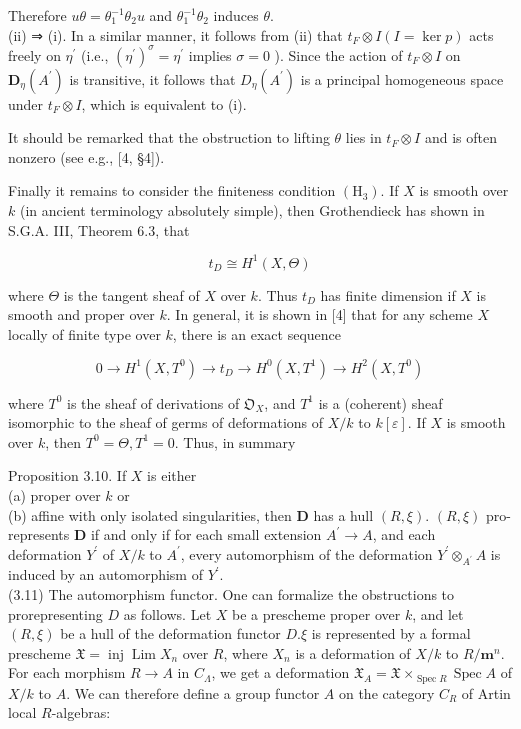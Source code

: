 \documentclass[10pt]{article}
\begin{document}
Therefore $u \theta=\theta_{1}^{-1} \theta_{2} u$ and $\theta_{1}^{-1} \theta_{2}$ induces $\theta$.\\
(ii) ⇒ (i). In a similar manner, it follows from (ii) that $t_{F} \otimes I(I=\operatorname{ker} p)$ acts freely on $\eta^{\prime}$ (i.e., $\left(\eta^{\prime}\right)^{\sigma}=\eta^{\prime}$ implies $\sigma=0$ ). Since the action of $t_{F} \otimes I$ on $\boldsymbol{D}_{\eta}\left(A^{\prime}\right)$ is transitive, it follows that $D_{\eta}\left(A^{\prime}\right)$ is a principal homogeneous space under $t_{F} \otimes I$, which is equivalent to (i).

It should be remarked that the obstruction to lifting $\theta$ lies in $t_{F} \otimes I$ and is often nonzero (see e.g., [4, §4]).

Finally it remains to consider the finiteness condition $\left(\mathrm{H}_{3}\right)$. If $X$ is smooth over $k$ (in ancient terminology absolutely simple), then Grothendieck has shown in S.G.A. III, Theorem 6.3, that

$$
t_{D} \cong H^{1}(X, \Theta)
$$

where $\Theta$ is the tangent sheaf of $X$ over $k$. Thus $t_{D}$ has finite dimension if $X$ is smooth and proper over $k$. In general, it is shown in [4] that for any scheme $X$ locally of finite type over $k$, there is an exact sequence


\begin{equation*}
0 \rightarrow H^{1}\left(X, T^{0}\right) \rightarrow t_{D} \rightarrow H^{0}\left(X, T^{1}\right) \rightarrow H^{2}\left(X, T^{0}\right) \tag{3.9}
\end{equation*}


where $T^{0}$ is the sheaf of derivations of $\mathfrak{O}_{X}$, and $T^{1}$ is a (coherent) sheaf isomorphic to the sheaf of germs of deformations of $X / k$ to $k[\varepsilon]$. If $X$ is smooth over $k$, then $T^{0}=\Theta, T^{1}=0$. Thus, in summary

Proposition 3.10. If $X$ is either\\
(a) proper over $k$ or\\
(b) affine with only isolated singularities, then $\boldsymbol{D}$ has a hull $(R, \xi)$. $(R, \xi)$ pro-represents $\boldsymbol{D}$ if and only if for each small extension $A^{\prime} \rightarrow A$, and each deformation $Y^{\prime}$ of $X / k$ to $A^{\prime}$, every automorphism of the deformation $Y^{\prime} \otimes_{A^{\prime}} A$ is induced by an automorphism of $Y^{\prime}$.\\
(3.11) The automorphism functor. One can formalize the obstructions to prorepresenting $D$ as follows. Let $X$ be a prescheme proper over $k$, and let $(R, \xi)$ be a hull of the deformation functor $D . \xi$ is represented by a formal prescheme $\mathfrak{X}=\operatorname{inj} \operatorname{Lim} X_{n}$ over $R$, where $X_{n}$ is a deformation of $X / k$ to $R / \boldsymbol{m}^{n}$. For each morphism $R \rightarrow A$ in $C_{\Lambda}$, we get a deformation $\mathfrak{X}_{A}=\mathfrak{X} \times_{\operatorname{Spec} R} \operatorname{Spec} A$ of $X / k$ to $A$. We can therefore define a group functor $A$ on the category $C_{R}$ of Artin local $R$-algebras:
\end{document}
